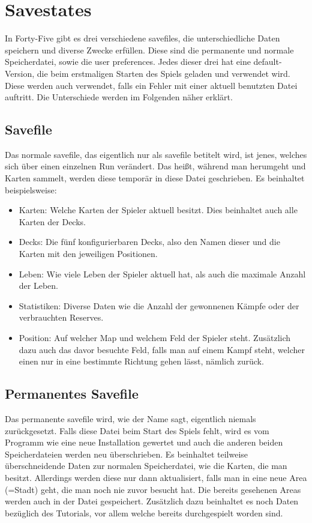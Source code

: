
\renewcommand{\kapitelautor}{Autor: Felix Zwickelstorfer}
\section{Savestates}\label{sec:savestates}
\renewcommand{\kapitelautor}{Autor: Felix Zwickelstorfer}

In Forty-Five gibt es drei verschiedene savefiles, die unterschiedliche Daten speichern und diverse Zwecke erfüllen.
Diese sind die permanente und normale Speicherdatei, sowie die user preferences.
Jedes dieser drei hat eine default-Version, die beim erstmaligen Starten des Spiels geladen und verwendet wird.
Diese werden auch verwendet, falls ein Fehler mit einer aktuell benutzten Datei auftritt.
Die Unterschiede werden im Folgenden näher erklärt.

\subsection{Savefile}\label{subsec:savefile}

Das normale savefile, das eigentlich nur als savefile betitelt wird, ist jenes, welches sich über einen einzelnen Run verändert.
Das heißt, während man herumgeht und Karten sammelt, werden diese temporär in diese Datei geschrieben.
Es beinhaltet beispielsweise:
\begin{itemize}
    \item Karten: Welche Karten der Spieler aktuell besitzt.
    Dies beinhaltet auch alle Karten der Decks.
    \item Decks: Die fünf konfigurierbaren Decks, also den Namen dieser und die Karten mit den jeweiligen Positionen.
    \item Leben: Wie viele Leben der Spieler aktuell hat, als auch die maximale Anzahl der Leben.
    \item Statistiken: Diverse Daten wie \zB die Anzahl der gewonnenen Kämpfe oder der verbrauchten Reserves.
    \item Position: Auf welcher Map und welchem Feld der Spieler steht.
    Zusätzlich dazu auch das davor besuchte Feld, falls man auf einem Kampf steht, welcher einen nur in eine bestimmte Richtung gehen lässt, nämlich zurück.
\end{itemize}

\subsection{Permanentes Savefile}\label{subsec:perma-savefile}
Das permanente savefile wird, wie der Name sagt, eigentlich niemals zurückgesetzt.
Falls diese Datei beim Start des Spiels fehlt, wird es vom Programm wie eine neue Installation gewertet und auch die anderen beiden Speicherdateien werden neu überschrieben.
Es beinhaltet teilweise überschneidende Daten zur normalen Speicherdatei, wie die Karten, die man besitzt.
Allerdings werden diese nur dann aktualisiert, falls man in eine neue Area (=Stadt) geht, die man noch nie zuvor besucht hat.
Die bereits gesehenen Areas werden auch in der Datei gespeichert.
Zusätzlich dazu beinhaltet es noch Daten bezüglich des Tutorials, vor allem welche bereits durchgespielt worden sind.

